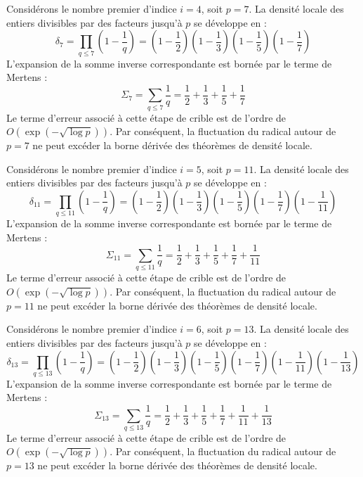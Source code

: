 \documentclass[12pt, a4paper]{article}
\begin{document}
Considérons le nombre premier d'indice $i = 4$, soit $p = 7$. La densité locale des entiers divisibles par des facteurs jusqu'à $p$ se développe en :
\begin{equation}
\delta_{7} = \prod_{q \le 7} \left( 1 - \frac{1}{q} \right) = \left(1 - \frac{1}{2}\right) \left(1 - \frac{1}{3}\right) \left(1 - \frac{1}{5}\right) \left(1 - \frac{1}{7}\right)
\end{equation}
L'expansion de la somme inverse correspondante est bornée par le terme de Mertens :
\begin{equation}
\Sigma_{7} = \sum_{q \le 7} \frac{1}{q} = \frac{1}{2} + \frac{1}{3} + \frac{1}{5} + \frac{1}{7}
\end{equation}
Le terme d'erreur associé à cette étape de crible est de l'ordre de $O(\exp(-\sqrt{\log p}))$. Par conséquent, la fluctuation du radical autour de $p=7$ ne peut excéder la borne dérivée des théorèmes de densité locale.


Considérons le nombre premier d'indice $i = 5$, soit $p = 11$. La densité locale des entiers divisibles par des facteurs jusqu'à $p$ se développe en :
\begin{equation}
\delta_{11} = \prod_{q \le 11} \left( 1 - \frac{1}{q} \right) = \left(1 - \frac{1}{2}\right) \left(1 - \frac{1}{3}\right) \left(1 - \frac{1}{5}\right) \left(1 - \frac{1}{7}\right) \left(1 - \frac{1}{11}\right)
\end{equation}
L'expansion de la somme inverse correspondante est bornée par le terme de Mertens :
\begin{equation}
\Sigma_{11} = \sum_{q \le 11} \frac{1}{q} = \frac{1}{2} + \frac{1}{3} + \frac{1}{5} + \frac{1}{7} + \frac{1}{11}
\end{equation}
Le terme d'erreur associé à cette étape de crible est de l'ordre de $O(\exp(-\sqrt{\log p}))$. Par conséquent, la fluctuation du radical autour de $p=11$ ne peut excéder la borne dérivée des théorèmes de densité locale.


Considérons le nombre premier d'indice $i = 6$, soit $p = 13$. La densité locale des entiers divisibles par des facteurs jusqu'à $p$ se développe en :
\begin{equation}
\delta_{13} = \prod_{q \le 13} \left( 1 - \frac{1}{q} \right) = \left(1 - \frac{1}{2}\right) \left(1 - \frac{1}{3}\right) \left(1 - \frac{1}{5}\right) \left(1 - \frac{1}{7}\right) \left(1 - \frac{1}{11}\right) \left(1 - \frac{1}{13}\right)
\end{equation}
L'expansion de la somme inverse correspondante est bornée par le terme de Mertens :
\begin{equation}
\Sigma_{13} = \sum_{q \le 13} \frac{1}{q} = \frac{1}{2} + \frac{1}{3} + \frac{1}{5} + \frac{1}{7} + \frac{1}{11} + \frac{1}{13}
\end{equation}
Le terme d'erreur associé à cette étape de crible est de l'ordre de $O(\exp(-\sqrt{\log p}))$. Par conséquent, la fluctuation du radical autour de $p=13$ ne peut excéder la borne dérivée des théorèmes de densité locale.
\end{document}
